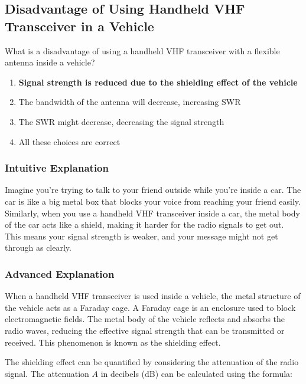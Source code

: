 \subsection{Disadvantage of Using Handheld VHF Transceiver in a Vehicle}
\label{T9A07}

\begin{tcolorbox}[colback=gray!10!white,colframe=black!75!black,title=T9A07]
What is a disadvantage of using a handheld VHF transceiver with a flexible antenna inside a vehicle?
\begin{enumerate}[label=\Alph*)]
    \item \textbf{Signal strength is reduced due to the shielding effect of the vehicle}
    \item The bandwidth of the antenna will decrease, increasing SWR
    \item The SWR might decrease, decreasing the signal strength
    \item All these choices are correct
\end{enumerate}
\end{tcolorbox}

\subsubsection{Intuitive Explanation}
Imagine you're trying to talk to your friend outside while you're inside a car. The car is like a big metal box that blocks your voice from reaching your friend easily. Similarly, when you use a handheld VHF transceiver inside a car, the metal body of the car acts like a shield, making it harder for the radio signals to get out. This means your signal strength is weaker, and your message might not get through as clearly.

\subsubsection{Advanced Explanation}
When a handheld VHF transceiver is used inside a vehicle, the metal structure of the vehicle acts as a Faraday cage. A Faraday cage is an enclosure used to block electromagnetic fields. The metal body of the vehicle reflects and absorbs the radio waves, reducing the effective signal strength that can be transmitted or received. This phenomenon is known as the shielding effect.

The shielding effect can be quantified by considering the attenuation of the radio signal. The attenuation \( A \) in decibels (dB) can be calculated using the formula:

